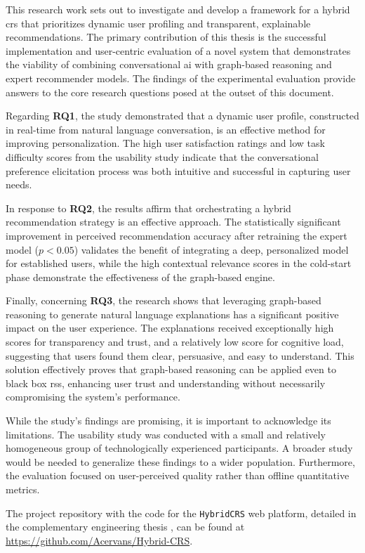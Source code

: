 This research work sets out to investigate and develop a framework for a hybrid \ac{crs} that prioritizes dynamic user profiling and transparent, explainable recommendations. The primary contribution of this thesis is the successful implementation and user-centric evaluation of a novel system that demonstrates the viability of combining conversational \ac{ai} with graph-based reasoning and expert recommender models. The findings of the experimental evaluation provide answers to the core research questions posed at the outset of this document.

Regarding \textbf{RQ1}, the study demonstrated that a dynamic user profile, constructed in real-time from natural language conversation, is an effective method for improving personalization. The high user satisfaction ratings and low task difficulty scores from the usability study indicate that the conversational preference elicitation process was both intuitive and successful in capturing user needs.

In response to \textbf{RQ2}, the results affirm that orchestrating a hybrid recommendation strategy is an effective approach. The statistically significant improvement in perceived recommendation accuracy after retraining the expert model ($p < 0.05$) validates the benefit of integrating a deep, personalized model for established users, while the high contextual relevance scores in the cold-start phase demonstrate the effectiveness of the graph-based engine.

Finally, concerning \textbf{RQ3}, the research shows that leveraging graph-based reasoning to generate natural language explanations has a significant positive impact on the user experience. The explanations received exceptionally high scores for transparency and trust, and a relatively low score for cognitive load, suggesting that users found them clear, persuasive, and easy to understand. This solution effectively proves that graph-based reasoning can be applied even to black box \aclp{rs}, enhancing user trust and understanding without necessarily compromising the system's performance.

While the study's findings are promising, it is important to acknowledge its limitations. The usability study was conducted with a small and relatively homogeneous group of technologically experienced participants. A broader study would be needed to generalize these findings to a wider population. Furthermore, the evaluation focused on user-perceived quality rather than offline quantitative metrics.

The project repository with the code for the \texttt{HybridCRS} web platform, detailed in the complementary engineering thesis \cite{MUII_THESIS}, can be found at \url{https://github.com/Acervans/Hybrid-CRS}.
